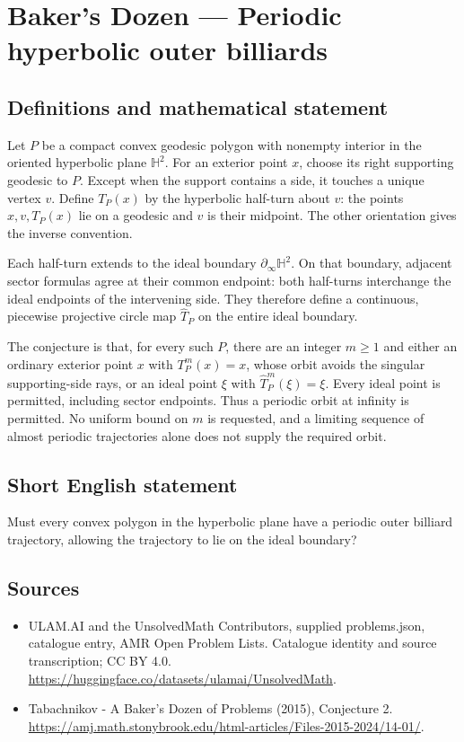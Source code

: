 \documentclass[11pt,a4paper]{article}
\begin{document}
\section*{Baker's Dozen — Periodic hyperbolic outer billiards}\label{statement}

\subsection{Definitions and mathematical statement}
Let $P$ be a compact convex geodesic polygon with nonempty interior in the
oriented hyperbolic plane $\mathbb H^2$. For an exterior point $x$, choose its
right supporting geodesic to $P$. Except when the support contains a side,
it touches a unique vertex $v$. Define $T_P(x)$ by the hyperbolic half-turn
about $v$: the points $x,v,T_P(x)$ lie on a geodesic and $v$ is their midpoint.
The other orientation gives the inverse convention.

Each half-turn extends to the ideal boundary $\partial_\infty\mathbb H^2$.
On that boundary, adjacent sector formulas agree at their common endpoint:
both half-turns interchange the ideal endpoints of the intervening side.
They therefore define a continuous, piecewise projective circle map
$\widehat T_P$ on the entire ideal boundary.

The conjecture is that, for every such $P$, there are an integer $m\ge1$
and either an ordinary exterior point $x$ with $T_P^m(x)=x$, whose orbit
avoids the singular supporting-side rays, or an ideal point $\xi$ with
$\widehat T_P^m(\xi)=\xi$. Every ideal point is permitted, including sector
endpoints. Thus a periodic orbit at infinity is permitted.
No uniform bound on $m$ is requested, and a limiting sequence of almost
periodic trajectories alone does not supply the required orbit.
\subsection{Short English statement}
Must every convex polygon in the hyperbolic plane have a periodic outer
billiard trajectory, allowing the trajectory to lie on the ideal boundary?
\subsection{Sources}
\begin{itemize}
\item[S1] ULAM.AI and the UnsolvedMath Contributors, supplied problems.json, catalogue entry, AMR Open Problem Lists. Catalogue identity and source transcription; CC BY 4.0.
\url{https://huggingface.co/datasets/ulamai/UnsolvedMath}.
\item[S2] Tabachnikov - A Baker's Dozen of Problems (2015), Conjecture 2. 
\url{https://amj.math.stonybrook.edu/html-articles/Files-2015-2024/14-01/}.
\end{itemize}
\end{document}
